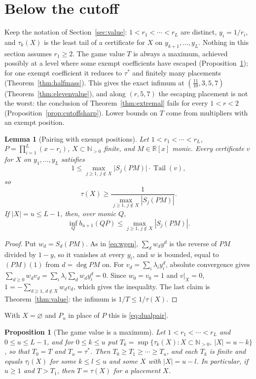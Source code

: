 \documentclass[11pt]{article}
\newtheorem{lemma}[theorem]{Lemma}
\newtheorem{proposition}[theorem]{Proposition}
\theoremstyle{definition}
\theoremstyle{plain}
\newcommand{\R}{\mathbb R}
\newcommand{\N}{\mathbb N}
\DeclareMathOperator{\Tail}{Tail}
\begin{document}
\section{Below the cutoff}\label{sec:belowtwo}

Keep the notation of Section~\ref{sec:value}: $1<r_1<\cdots<r_L$ are
distinct, $y_i=1/r_i$, and $\tau_k(X)$ is the least tail of a certificate
for $X$ on $y_{k+1},\ldots,y_L$.  Nothing in this section assumes
$r_1\ge2$.  The game value $T$ is always a maximum, achieved possibly at a level
where some exempt coefficients have escaped
(Proposition~\ref{prop:attainT}); for one exempt coefficient it reduces to
$\tau^*$ and finitely many placements (Theorem~\ref{thm:halfmass}).  This
gives the exact infimum at $(\tfrac{11}{10},3,5,7)$
(Theorem~\ref{thm:elevenvalue}), and along $(r,5,7)$ the escaping placement
is not the worst: the conclusion of Theorem~\ref{thm:extremal} fails for every $1<r<2$
(Proposition~\ref{prop:cutoffsharp}).  Lower bounds on $T$ come from
multipliers with an exempt position.

\begin{lemma}[Pairing with exempt positions]\label{lem:exemptpair}
Let $1<r_1<\cdots<r_L$, $P=\prod_{i=1}^L(x-r_i)$, $X\subset\N_{>0}$ finite,
and $M\in\R[x]$ monic.  Every certificate $v$ for $X$ on $y_1,\ldots,y_L$
satisfies
\[
  1\le\max_{j\ge1,\,j\notin X}\bigl|S_j(PM)\bigr|\cdot\Tail(v),
\]
so
\[
  \tau(X)\ge\frac1{\max_{j\ge1,\,j\notin X}|S_j(PM)|}.
\]
If $|X|=u\le L-1$, then, over monic $Q$,
\[
  \inf_Qb_{u+1}(QP)\le\max_{j\ge1,\,j\notin X}|S_j(PM)|.
\]
\end{lemma}

\begin{proof}
Put $w_d=S_d(PM)$.  As in \eqref{eq:wgen}, $\sum_dw_dy^d$ is the reverse of
$PM$ divided by $1-y$, so it vanishes at every $y_i$, and $w$ is bounded,
equal to $(PM)(1)$ from $d=\deg PM$ on.  For $v_d=\sum_i\lambda_iy_i^d$,
absolute convergence gives
$\sum_{d\ge0}w_dv_d=\sum_i\lambda_i\sum_dw_dy_i^d=0$.  Since
$w_0=v_0=1$ and $v|_X=0$, $1=-\sum_{d\ge1,\,d\notin X}w_dv_d$, which gives
the inequality.  The last claim is Theorem~\ref{thm:value}:
the infimum is $1/T\le1/\tau(X)$.
\end{proof}

With $X=\varnothing$ and $P_u$ in place of $P$ this is \eqref{eq:dualpair}.

\begin{proposition}[The game value is a maximum]\label{prop:attainT}
Let $1<r_1<\cdots<r_L$ and $0\le u\le L-1$, and for $0\le k\le u$ put
$T_k=\sup\{\tau_k(X):X\subset\N_{>0},\ |X|=u-k\}$, so that $T_0=T$ and
$T_u=\tau^*$.  Then $T_0\ge T_1\ge\cdots\ge T_u$, and each $T_k$ is finite
and equals $\tau_l(X)$ for some $k\le l\le u$ and some $X$ with $|X|=u-l$.
In particular, if $u\ge1$ and $T>T_1$, then $T=\tau(X)$ for a placement $X$.
\end{proposition}
\end{document}

